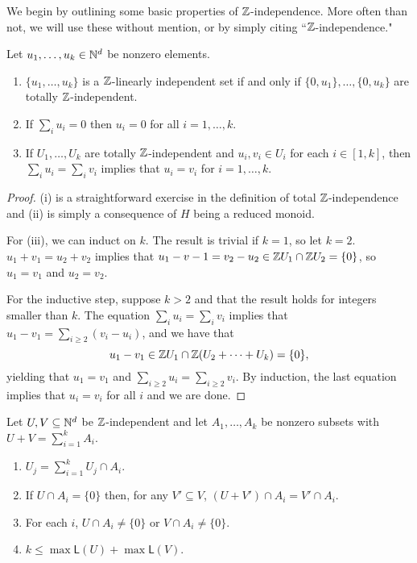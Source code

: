 We begin by outlining some basic properties of $\mathbb{Z}$-independence.  
More often than not, we will use these without mention, or by simply citing ``$\mathbb{Z}$-independence."
\begin{prop} \label{prop:eltwise-indep}
Let $u_1,\dots, u_k\in \mathbb{N}^d$ be nonzero elements.
\begin{enumerate}[label={\rm (\roman{*})}]
	\item $\{u_1,\dots,u_k\}$ is a $\mathbb{Z}$-linearly independent set if and only if $\{0,u_1\},\dots,\{0,u_k\}$ are totally $\mathbb{Z}$-independent.
	
	\item If $\sum_i u_i = 0$ then $u_i = 0$ for all $i=1,\dots, k$.
	
	\item If $U_1,\dots, U_k$ are totally $\mathbb{Z}$-independent and $u_i, v_i\in U_i$ for each $i\in [ 1,k ]$,
	then $\sum_i u_i = \sum_i v_i$ implies that $u_i = v_i$ for $i = 1,\dots, k$.
\end{enumerate}
\end{prop}

\begin{proof}
(i) is a straightforward exercise in the definition of total $\mathbb{Z}$-independence and (ii) is simply a consequence of $H$ being a reduced monoid.

For (iii), we can induct on $k$.
The result is trivial if $k = 1$, so let $k=2$.
$u_1 + v_1 = u_2 + v_2$ implies that $u_1 - v-1 = v_2 - u_2 \in \mathbb{Z} U_1 \cap \mathbb{Z} U_2 = \{0\}$, so $u_1 = v_1$ and $u_2 = v_2$.

For the inductive step, suppose $k>2$ and that the result holds for integers smaller than $k$.
The equation $\sum_i u_i = \sum_i v_i$ implies that $u_1 - v_1 = \sum_{i\ge 2} (v_i - u_i)$, and we have that 
\[u_1 - v_1 \in \mathbb{Z} U_1 \cap \mathbb{Z}(U_2+\cdots+U_k) = \{0\},\]
yielding that $u_1 = v_1$ and $\sum_{i\ge 2} u_i = \sum_{i\ge 2} v_i$.
By induction, the last equation implies that $u_i = v_i$ for all $i$ and we are done.
\end{proof}

\begin{prop} \label{prop:indep-decomp}
Let $U,V \subseteq \mathbb{N}^d$ be $\mathbb{Z}$-independent and let $A_1,\dots, A_k$ be nonzero subsets with $U+V = \sum_{i=1}^k A_i$.
\begin{enumerate}[label={\rm (\roman{*})}]
	\item $U_j = \sum_{i=1}^k U_j\cap A_i$.
	\item If $U \cap A_i = \{0\}$ then, for any $V'\subseteq V$, $(U+V')\cap A_i = V'\cap A_i$.
	\item For each $i$, $U\cap A_i \neq \{0\}$ or $V \cap A_i \neq \{0\}$.
	\item $k \le \max \mathsf{L}(U) + \max \mathsf{L}(V)$.
\end{enumerate}
\end{prop}

